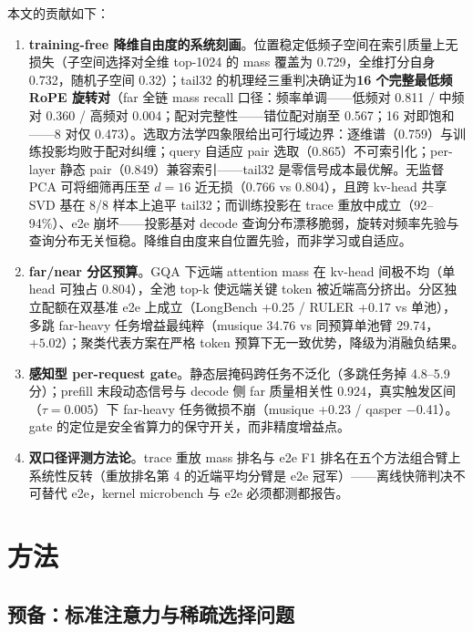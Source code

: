 \documentclass[11pt]{article}
\begin{document}
本文的贡献如下：
\begin{enumerate}
\item \textbf{training-free 降维自由度的系统刻画}。位置稳定低频子空间在索引质量上无损失（子空间选择对全维 top-1024 的 mass 覆盖为 0.729，全维打分自身 0.732，随机子空间 0.32）；tail32 的机理经三重判决确证为\textbf{16 个完整最低频 RoPE 旋转对}（far 全链 mass recall 口径：频率单调——低频对 0.811 / 中频对 0.360 / 高频对 0.004；配对完整性——错位配对崩至 0.567；16 对即饱和——8 对仅 0.473）。选取方法学四象限给出可行域边界：逐维谱（0.759）与训练投影均败于配对纠缠；query 自适应 pair 选取（0.865）不可索引化；per-layer 静态 pair（0.849）兼容索引——tail32 是零信号成本最优解。无监督 PCA 可将细筛再压至 $d{=}16$ 近无损（0.766 vs 0.804），且跨 kv-head 共享 SVD 基在 8/8 样本上追平 tail32；而训练投影在 trace 重放中成立（92--94\%）、e2e 崩坏——投影基对 decode 查询分布漂移脆弱，旋转对频率先验与查询分布无关恒稳。降维自由度来自位置先验，而非学习或自适应。
\item \textbf{far/near 分区预算}。GQA 下远端 attention mass 在 kv-head 间极不均（单 head 可独占 0.804），全池 top-k 使远端关键 token 被近端高分挤出。分区独立配额在双基准 e2e 上成立（LongBench +0.25 / RULER +0.17 vs 单池），多跳 far-heavy 任务增益最纯粹（musique 34.76 vs 同预算单池臂 29.74，$+5.02$）；聚类代表方案在严格 token 预算下无一致优势，降级为消融负结果。
\item \textbf{感知型 per-request gate}。静态层掩码跨任务不泛化（多跳任务掉 4.8--5.9 分）；prefill 末段动态信号与 decode 侧 far 质量相关性 0.924，真实触发区间（$\tau{=}0.005$）下 far-heavy 任务微损不崩（musique +0.23 / qasper $-$0.41）。gate 的定位是安全省算力的保守开关，而非精度增益点。
\item \textbf{双口径评测方法论}。trace 重放 mass 排名与 e2e F1 排名在五个方法组合臂上系统性反转（重放排名第 4 的近端平均分臂是 e2e 冠军）——离线快筛判决不可替代 e2e，kernel microbench 与 e2e 必须都测都报告。
\end{enumerate}

\section{方法}

\subsection{预备：标准注意力与稀疏选择问题}
\end{document}
